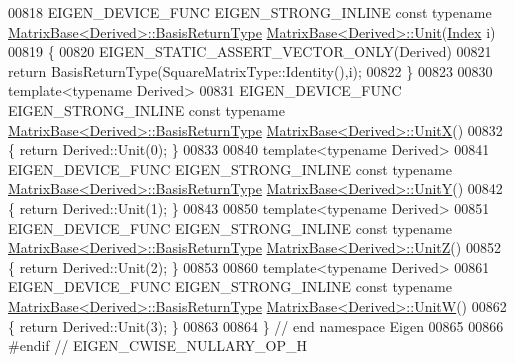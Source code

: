 \begin{DoxyCode}
00818 EIGEN\_DEVICE\_FUNC EIGEN\_STRONG\_INLINE \textcolor{keyword}{const} \textcolor{keyword}{typename} 
      \hyperlink{group___core___module_class_eigen_1_1_block}{MatrixBase<Derived>::BasisReturnType} 
      \hyperlink{group___core___module_a1f39dde25807c1f008aa874e690b3fed}{MatrixBase<Derived>::Unit}(\hyperlink{namespace_eigen_a62e77e0933482dafde8fe197d9a2cfde}{Index} i)
00819 \{
00820   EIGEN\_STATIC\_ASSERT\_VECTOR\_ONLY(Derived)
00821   \textcolor{keywordflow}{return} BasisReturnType(SquareMatrixType::Identity(),i);
00822 \}
00823 
00830 \textcolor{keyword}{template}<\textcolor{keyword}{typename} Derived>
00831 EIGEN\_DEVICE\_FUNC EIGEN\_STRONG\_INLINE \textcolor{keyword}{const} \textcolor{keyword}{typename} 
      \hyperlink{group___core___module_class_eigen_1_1_block}{MatrixBase<Derived>::BasisReturnType} 
      \hyperlink{group___core___module_ac12aa899494685551e11f238836ee600}{MatrixBase<Derived>::UnitX}()
00832 \{ \textcolor{keywordflow}{return} Derived::Unit(0); \}
00833 
00840 \textcolor{keyword}{template}<\textcolor{keyword}{typename} Derived>
00841 EIGEN\_DEVICE\_FUNC EIGEN\_STRONG\_INLINE \textcolor{keyword}{const} \textcolor{keyword}{typename} 
      \hyperlink{group___core___module_class_eigen_1_1_block}{MatrixBase<Derived>::BasisReturnType} 
      \hyperlink{group___core___module_ab8e21066a2e5cf5ca8bb0383e44a6efa}{MatrixBase<Derived>::UnitY}()
00842 \{ \textcolor{keywordflow}{return} Derived::Unit(1); \}
00843 
00850 \textcolor{keyword}{template}<\textcolor{keyword}{typename} Derived>
00851 EIGEN\_DEVICE\_FUNC EIGEN\_STRONG\_INLINE \textcolor{keyword}{const} \textcolor{keyword}{typename} 
      \hyperlink{group___core___module_class_eigen_1_1_block}{MatrixBase<Derived>::BasisReturnType} 
      \hyperlink{group___core___module_a122e525a8f5ef3e4d459055615f662de}{MatrixBase<Derived>::UnitZ}()
00852 \{ \textcolor{keywordflow}{return} Derived::Unit(2); \}
00853 
00860 \textcolor{keyword}{template}<\textcolor{keyword}{typename} Derived>
00861 EIGEN\_DEVICE\_FUNC EIGEN\_STRONG\_INLINE \textcolor{keyword}{const} \textcolor{keyword}{typename} 
      \hyperlink{group___core___module_class_eigen_1_1_block}{MatrixBase<Derived>::BasisReturnType} 
      \hyperlink{group___core___module_ac28c3d440440464b1fc8d9f2a6d5624a}{MatrixBase<Derived>::UnitW}()
00862 \{ \textcolor{keywordflow}{return} Derived::Unit(3); \}
00863 
00864 \} \textcolor{comment}{// end namespace Eigen}
00865 
00866 \textcolor{preprocessor}{#endif // EIGEN\_CWISE\_NULLARY\_OP\_H}
\end{DoxyCode}

